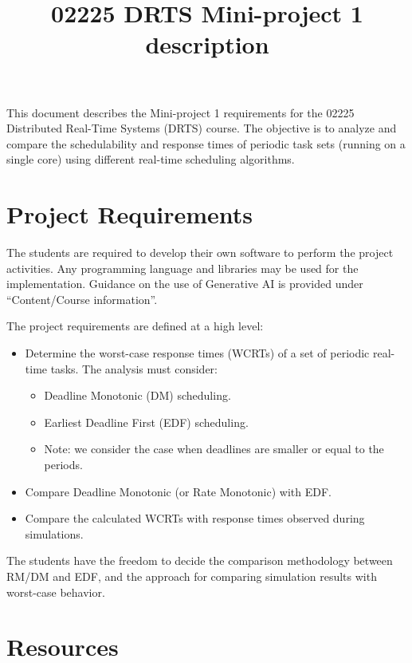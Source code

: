 \documentclass[a4paper,11pt]{article}
\begin{document}
\title{\vspace{-50pt} 02225 DRTS Mini-project 1 description}
\author{}
\date{}

\maketitle

\vspace{-20pt}
This document describes the Mini-project 1 requirements for the 02225 Distributed Real-Time Systems (DRTS) course. The objective is to analyze and compare the schedulability and response times of periodic task sets (running on a single core) using different real-time scheduling algorithms.

\section{Project Requirements}

The students are required to develop their own software to perform the project activities. Any programming language and libraries may be used for the implementation. Guidance on the use of Generative AI is provided under ``Content/Course information''.

The project requirements are defined at a high level:

\begin{itemize}
    \item Determine the worst-case response times (WCRTs) of a set of periodic real-time tasks. The analysis must consider:
    \begin{itemize}
        \item Deadline Monotonic (DM) scheduling.
        \item Earliest Deadline First (EDF) scheduling.
        \item Note: we consider the case when deadlines are smaller or equal to the periods.
    \end{itemize}
    \item Compare Deadline Monotonic (or Rate Monotonic) with EDF.
    \item Compare the calculated WCRTs with response times observed during simulations. 
\end{itemize}

The students have the freedom to decide the comparison methodology between RM/DM and EDF, and the approach for comparing simulation results with worst-case behavior. 

\section{Resources}
\end{document}
